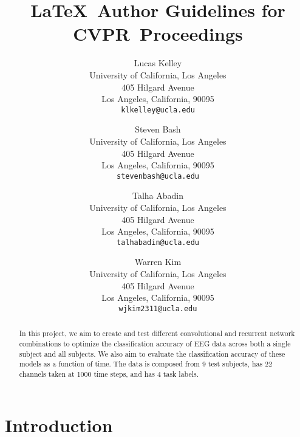 \documentclass[10pt,twocolumn,letterpaper]{article}
\def\confName{CVPR}
\begin{document}
\title{\LaTeX\ Author Guidelines for \confName~Proceedings}

\author{Lucas Kelley\\
University of California, Los Angeles\\
405 Hilgard Avenue\\
Los Angeles, California, 90095\\
{\tt\small klkelley@ucla.edu}
\and
Steven Bash\\
University of California, Los Angeles\\
405 Hilgard Avenue\\
Los Angeles, California, 90095\\
{\tt\small stevenbash@ucla.edu}
\and
Talha Abadin\\
University of California, Los Angeles\\
405 Hilgard Avenue\\
Los Angeles, California, 90095\\
{\tt\small talhabadin@ucla.edu}
\and
Warren Kim\\
University of California, Los Angeles\\
405 Hilgard Avenue\\
Los Angeles, California, 90095\\
{\tt\small wjkim2311@ucla.edu}
}
\maketitle

\begin{abstract}
    In this project, we aim to create and test different convolutional and
    recurrent network combinations to optimize the classification accuracy of
    EEG data across both a single subject and all subjects.  We also aim to
    evaluate the classification accuracy of these models as a function of time.
    The data is composed from 9 test subjects, has 22 channels taken at 1000
    time steps, and has 4 task labels.
\end{abstract}

\section{Introduction}
\label{sec:intro}
\end{document}
